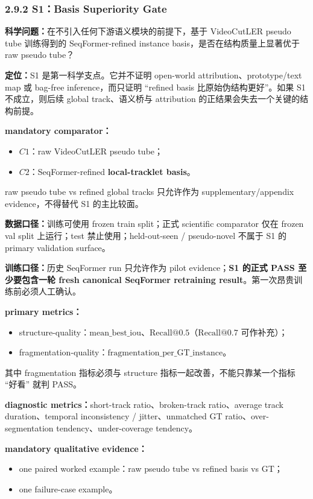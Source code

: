 \documentclass[UTF8]{ctexart}
\begin{document}
\subsubsection*{2.9.2 S1：Basis Superiority Gate}
\textbf{科学问题：}在不引入任何下游语义模块的前提下，基于 VideoCutLER pseudo tube 训练得到的 SeqFormer-refined instance basis，是否在结构质量上显著优于 raw pseudo tube？

\textbf{定位：}S1 是第一科学支点。它并不证明 open-world attribution、prototype/text map 或 bag-free inference，而只证明 ``refined basis 比原始伪结构更好''。如果 S1 不成立，则后续 global track、语义桥与 attribution 的正结果会失去一个关键的结构前提。

\textbf{mandatory comparator：}
\begin{itemize}
\item $C1$：raw VideoCutLER pseudo tube；
\item $C2$：SeqFormer-refined \textbf{local-tracklet basis}。
\end{itemize}
raw pseudo tube vs refined global tracks 只允许作为 supplementary/appendix evidence，不得替代 S1 的主比较面。

\textbf{数据口径：}训练可使用 frozen train split；正式 scientific comparator 仅在 frozen val split 上运行；test 禁止使用；held-out-seen / pseudo-novel 不属于 S1 的 primary validation surface。

\textbf{训练口径：}历史 SeqFormer run 只允许作为 pilot evidence；\textbf{S1 的正式 PASS 至少要包含一轮 fresh canonical SeqFormer retraining result}。第一次昂贵训练前必须人工确认。

\textbf{primary metrics：}
\begin{itemize}
\item structure-quality：$\mathrm{mean\_best\_iou}$、$\mathrm{Recall@0.5}$（$\mathrm{Recall@0.7}$ 可作补充）；
\item fragmentation-quality：$\mathrm{fragmentation\_per\_GT\_instance}$。
\end{itemize}
其中 fragmentation 指标必须与 structure 指标一起改善，不能只靠某一个指标 ``好看'' 就判 PASS。

\textbf{diagnostic metrics：}short-track ratio、broken-track ratio、average track duration、temporal inconsistency / jitter、unmatched GT ratio、over-segmentation tendency、under-coverage tendency。

\textbf{mandatory qualitative evidence：}
\begin{itemize}
\item one paired worked example：raw pseudo tube vs refined basis vs GT；
\item one failure-case example。
\end{itemize}
\end{document}
